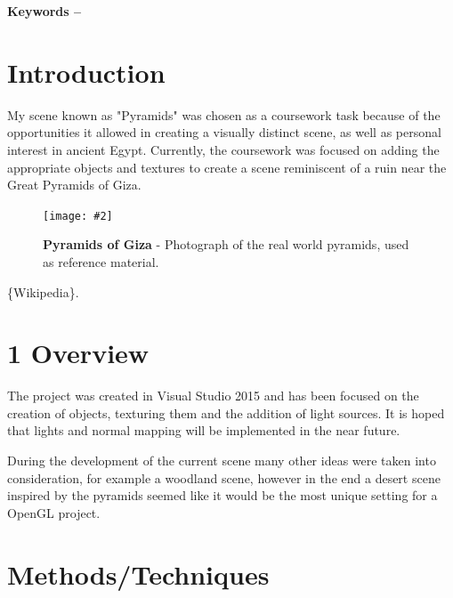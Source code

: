 \documentclass[10pt, a4paper]{article}
\title{\mytitle}
\author{\myauthor\hspace{1em}\\\contact\\Edinburgh Napier University\hspace{0.5em}-\hspace{0.5em}\mymodule}
\date{}
\newcommand{\figuremacro}[5]{
    \begin{figure}[#1]
        \centering
        \texttt{[image: \#2]}
        \caption[#3]{\textbf{#3}#4}
        \label{fig:#2}
    \end{figure}
}
\begin{document}
	\maketitle
	\begin{abstract}
		The purpose of this project was to develop a 3D scene using OpenGL and C++ containing multiple pieces of three dimensional geometry, texturing effects, lighting effects and some form of post processing effects. Several different methods and techniques were used to achieve a satisfactory end result. This report will detail all the technical aspects of the project, such as the code that was used to achieve some of the effects in question.
		
		
	\end{abstract}
    
	\textbf{Keywords -- }{\mykeywords}
	\section{Introduction}
	My scene known as "Pyramids" was chosen as a coursework task because of the opportunities it allowed in creating a visually distinct scene, as well as personal interest in ancient Egypt. Currently, the coursework was focused on adding the appropriate objects and textures to create a scene reminiscent of a ruin near the Great Pyramids of Giza.
	
	
	 \figuremacro{h}{pyramids}{Pyramids of Giza}{ - Photograph of the real world pyramids, used as reference material.}{1.0}
	\{Wikipedia\}.
	
    \section{1 Overview}
    The project was created in Visual Studio 2015 and has been focused on the creation of objects, texturing them and the addition of light sources. 
    It is hoped that lights and normal mapping will be implemented in the near future.
    
    During the development of the current scene many other ideas were taken into consideration, for example a woodland scene, however in the end a desert scene inspired by the pyramids seemed like it would be the most unique setting for a OpenGL project.
    
    
    \section{Methods/Techniques}
    
\end{document}
